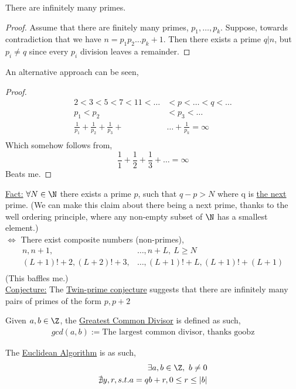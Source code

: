 \documentclass[../notes.tex]{subfiles}
\begin{document}
\begin{theorem}
    There are infinitely many primes.
\end{theorem}
\begin{proof}
    Assume that there are finitely many primes, $p_1,\dots,p_k$.
    Suppose, towards contradiction that we have $n=p_1p_2\dots p_k +1$.
    Then there exists a prime $q|n$, but $p_i\neq q$ since every $p_i$
    division leaves a remainder.
\end{proof}
An alternative approach can be seen,
\begin{proof}
    \begin{align*}
        2<3<5<7<11<\dots&<p<\dots<q<\dots\\
        p_1<p_2&<p_3<\dots\\
        \frac{1}{p_1}+ \frac{1}{p_2}+\frac{1}{p_3}+&\dots+
        \frac{1}{p_k}=\infty\\
    \end{align*}
    Which somehow follows from,
    \[
        \frac{1}{1}+ \frac{1}{2}+ \frac{1}{3}+\dots=\infty
    \]
    Beats me.
\end{proof}
\underline{Fact:} $\forall N\in \N$ there exists a prime $p$,
such that $q-p>N$ where q is \underline{the next} prime.
(We can make this claim about there being a next prime,
thanks to the well ordering principle, where any non-empty subset of 
$\N$ has a smallest element.)\\
$\iff$ There exist composite numbers (non-primes),
\begin{align*}
    n,n+1,&\dots,n+L,\ L\geq N\\
    (L+1)!+2,(L+2)!+3,&\dots,(L+1)!+L,(L+1)!+(L+1)\\
\end{align*}
(This baffles me.)\\
\vspace{.2cm}
\underline{Conjecture:} The \underline{Twin-prime conjecture} suggests that
there are infinitely many pairs of primes of the form $p,p+2$
\vspace{.2cm}
\begin{definition}
    Given $a,b\in \Z$, the \underline{Greatest Common Divisor} is defined
    as such,
    \begin{align*}
        gcd(a,b):= \text{The largest common divisor, thanks goobz}
    \end{align*}
\end{definition}
\vspace{.2cm}
The \underline{Euclidean Algorithm} is as such,
\begin{align*}
    \exists a,b\in \Z,\ b\neq 0\\
    \nexists y, r, s.t. a=qb+r,  0\leq r\leq |b|\\
\end{align*}
\end{document}
